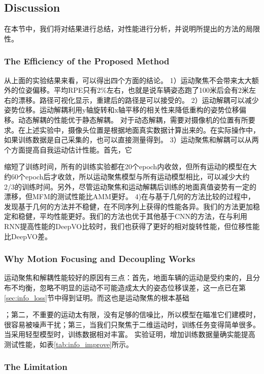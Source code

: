 {\subsection{Discussion}

在本节中，我们将对结果进行总结，对性能进行分析，并说明所提出的方法的局限性。
\subsubsection{The Efficiency of the Proposed Method}

从上面的实验结果来看，可以得出四个方面的结论。
1）运动聚焦不会带来太大额外的位姿偏移。平均RPE只有2\%左右，也就是说{车辆姿态}跑了100米后会有2米左右的漂移。路径可视化显示，重建后的路径是可以接受的。
2）运动解耦可以减少姿势位移。运动解耦利用y轴旋转和x轴平移的相关性来降低重构的姿势位移偏移。动态解耦的性能优于静态解耦。
对于动态解耦，需要对摄像机的位置有所要求。在上述实验中，摄像头位置是根据地面真实数据计算出来的。在实际操作中，如果训练数据是自己采集的，也可以直接测量得到。
3）运动聚焦{和解耦}可以从两个方面提高自我运动估计性能。首先，它{缩短了训练时间，所有的训练实验都在20个epoch内收敛，但所有运动的模型在大约60个epoch后才收敛，所以运动聚焦模型与所有运动模型相比，可以减少大约2/3的训练时间。另外，尽管运动聚焦和运动解耦后训练的地面真值姿势有一定的漂移，但{MFM}的测试性能比{AMM}更好。
4)在与基于几何的方法比较的过程中，发现基于几何的方法并不稳健，在不同序列上获得的性能各异。我们的方法更加稳定和稳健，平均性能更好。我们的方法也优于其他基于CNN的方法，在与利用RNN提高性能的DeepVO\cite{wang2017deepvo}比较时，我们也获得了更好的相对旋转性能，但位移性能比DeepVO差。


\subsubsection{Why Motion Focusing { and Decoupling} Works}

运动聚焦{和解耦}性能较好的原因有三点：首先，地面车辆的运动是受约束的，且分布不均衡，忽略不明显的运动不可能造成太大的姿态{位移}误差，这一点已在第\ref{sec:info_loss}节中得到证明。而这也是运动聚焦的根本基础}；第二，不重要的运动太有限，没有足够的信噪比，所以模型在瞄准它们建模时，很容易被噪声干扰；第三，当我们只聚焦于二维运动时，训练任务变得{简单很多}。当采用{轻型}模型时，训练数据相对丰富。
实验证明，增加训练数据量确实能提高测试性能，如表\ref{tab:info_improve}所示。

\subsubsection{The Limitation} 

}
